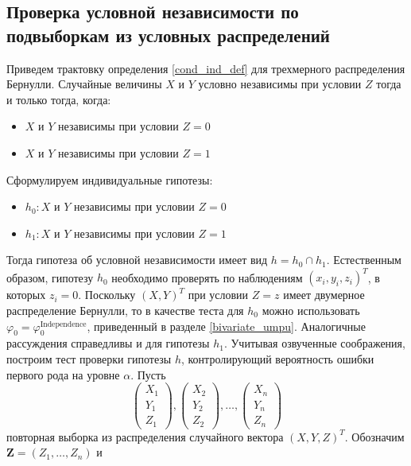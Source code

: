 \begin{centering}
    \subsection{Проверка условной независимости по подвыборкам из условных распределений}\label{twos}
\end{centering}

Приведем трактовку определения \ref{cond_ind_def} для трехмерного
распределения Бернулли. Случайные величины $X$ и $Y$
условно независимы при условии $Z$ тогда и только тогда,
когда:
\begin{itemize}
    \item $X$ и $Y$ независимы при условии $Z=0$
    \item $X$ и $Y$  независимы при условии $Z=1$
\end{itemize}
Сформулируем индивидуальные гипотезы:
\begin{itemize}
    \item $h_0 : X$ и $Y$ независимы при условии $Z=0$
    \item $h_1 : X$ и $Y$ независимы при условии $Z=1$
\end{itemize}
Тогда гипотеза об условной независимости имеет вид 
$h = h_0 \cap h_1$. Естественным образом, гипотезу 
$h_0$ необходимо проверять по наблюдениям
$(x_i,y_i,z_i)^T$, в которых $z_i=0$. Поскольку $(X,Y)^T$ при условии
$Z=z$ имеет двумерное распределение Бернулли, то
в качестве теста для $h_0$ можно использовать
$\varphi_0 = \varphi^{\text{Independence}}_0$, 
приведенный в разделе \ref{bivariate_umpu}. Аналогичные рассуждения 
справедливы и для гипотезы $h_1$. Учитывая озвученные соображения,
построим тест проверки гипотезы $h$, контролирующий вероятность
ошибки первого рода на уровне $\alpha$.
Пусть
$$
\begin{pmatrix}
        X_1 \\
        Y_1 \\
        Z_1
    \end{pmatrix},
    \begin{pmatrix}
        X_2 \\
        Y_2 \\
        Z_2
    \end{pmatrix}, \ldots,
    \begin{pmatrix}
        X_n \\
        Y_n \\
        Z_n
    \end{pmatrix}
$$ повторная выборка из распределения случайного вектора $(X,Y,Z)^T$. Обозначим $\mathbf{Z}=(Z_1,\ldots,Z_n)$ и 

